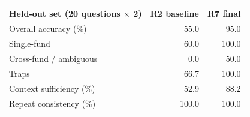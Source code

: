 \begin{tabular}{lrr}
\toprule
Held-out set (20 questions $\times$ 2) & R2 baseline & R7 final \\
\midrule
Overall accuracy (\%) & 55.0 & 95.0 \\
\quad Single-fund & 60.0 & 100.0 \\
\quad Cross-fund / ambiguous & 0.0 & 50.0 \\
\quad Traps & 66.7 & 100.0 \\
Context sufficiency (\%) & 52.9 & 88.2 \\
Repeat consistency (\%) & 100.0 & 100.0 \\
\bottomrule
\end{tabular}
